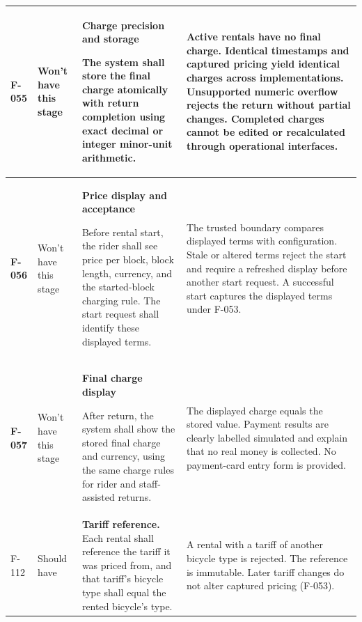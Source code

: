 \documentclass[10pt,a4paper,landscape]{article}
\newcommand{\reqtitle}[1]{{\fontsize{11}{13}\selectfont\bfseries #1}\par\nobreak\vspace{2pt}\noindent}
\begin{document}
\begin{longtable}{|C{27mm}|C{25mm}|L{79mm}|L{111mm}|}
\textbf{F-055} & Won't have this stage & \reqtitle{Charge precision and storage}The system shall store the final charge atomically with return completion using exact decimal or integer minor-unit arithmetic. & Active rentals have no final charge. Identical timestamps and captured pricing yield identical charges across implementations. Unsupported numeric overflow rejects the return without partial changes. Completed charges cannot be edited or recalculated through operational interfaces. \\\hline

\textbf{F-056} & Won't have this stage & \reqtitle{Price display and acceptance}Before rental start, the rider shall see price per block, block length, currency, and the started-block charging rule. The start request shall identify these displayed terms. & The trusted boundary compares displayed terms with configuration. Stale or altered terms reject the start and require a refreshed display before another start request. A successful start captures the displayed terms under F-053. \\\hline

\textbf{F-057} & Won't have this stage & \reqtitle{Final charge display}After return, the system shall show the stored final charge and currency, using the same charge rules for rider and staff-assisted returns. & The displayed charge equals the stored value. Payment results are clearly labelled simulated and explain that no real money is collected. No payment-card entry form is provided. \\\hline

F-112 & Should have & \textbf{Tariff reference.} Each rental shall reference the tariff it was priced from, and that tariff's bicycle type shall equal the rented bicycle's type. & A rental with a tariff of another bicycle type is rejected. The reference is immutable. Later tariff changes do not alter captured pricing (F-053). \\ \hline

\end{longtable}
\endgroup

\end{document}

